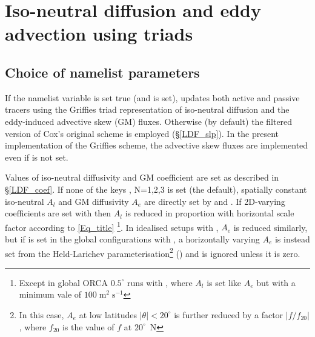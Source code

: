 \chapter[Iso-neutral diffusion and eddy advection using
triads]{Iso-neutral diffusion and eddy advection using triads}
\label{sec:triad}
\minitoc
\pagebreak
\section{Choice of  namelist parameters}
If the namelist variable  is set true (and
 is set), \NEMO updates both active and passive tracers
using the Griffies triad representation of iso-neutral diffusion and
the eddy-induced advective skew (GM) fluxes. Otherwise (by default) the
filtered version of Cox's original scheme is employed
(\S\ref{LDF_slp}). In the present implementation of the Griffies
scheme, the advective skew fluxes are implemented even if
 is not set.

Values of iso-neutral diffusivity and GM coefficient are set as
described in \S\ref{LDF_coef}. If none of the keys ,
N=1,2,3 is set (the default), spatially constant iso-neutral $A_l$ and
GM diffusivity $A_e$ are directly set by  and
. If 2D-varying coefficients are set with
 then $A_l$ is reduced in proportion with horizontal
scale factor according to \eqref{Eq_title} \footnote{Except in global ORCA
  $0.5^{\circ}$ runs with , where
  $A_l$ is set like $A_e$ but with a minimum vale of
  $100\;\mathrm{m}^2\;\mathrm{s}^{-1}$}. In idealised setups with
, $A_e$ is reduced similarly, but if 
is set in the global configurations with , a horizontally varying $A_e$ is
instead set from the Held-Larichev parameterisation\footnote{In this
  case, $A_e$ at low latitudes $|\theta|<20^{\circ}$ is further
  reduced by a factor $|f/f_{20}|$, where $f_{20}$ is the value of $f$
  at $20^{\circ}$~N} () and  is ignored
unless it is zero.

